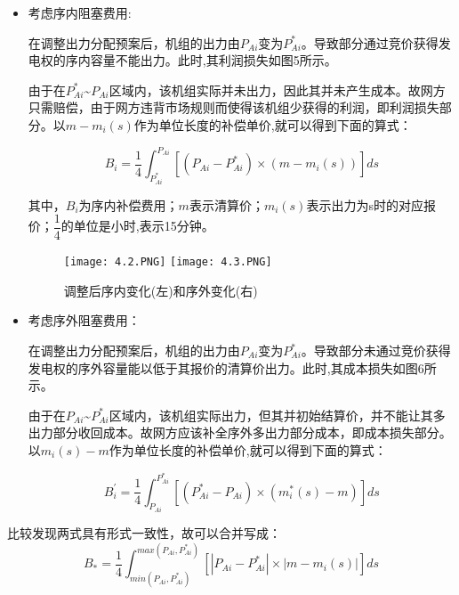 \documentclass[12pt,a4paper]{ctexart}
\begin{document}
\begin{itemize}
	\vspace{0.5em}
	\item 考虑序内阻塞费用:
	
	\vspace{0.5em}
	在调整出力分配预案后，机组的出力由$P_{Ai}$变为$P_{Ai}^{*}$。导致部分通过竞价获得发电权的序内容量不能出力。此时,其利润损失如图5所示。
	
	由于在$P_{Ai}^{*}$\~{}$P_{Ai}$区域内，该机组实际并未出力，因此其并未产生成本。故网方只需赔偿，由于网方违背市场规则而使得该机组少获得的利润，即利润损失部分。以$m-m_{i}{(s)}$作为单位长度的补偿单价,就可以得到下面的算式：
	
	\begin{equation}
		B_{i}=\dfrac{1}{4} \int_{P_{Ai}^{*}}^{P_{Ai}} [(P_{Ai}-P_{Ai}^{*})\times (m-m_{i}(s))] ds
		\label{1}
	\end{equation}
	
	其中，$B_{i}$为序内补偿费用；$m$表示清算价；$m_{i}{(s)}$表示出力为s时的对应报价；$\dfrac{1}{4}$的单位是小时,表示15分钟。
	
	\vspace{0.5em}
		\begin{figure}[!h]
		\centering	%
		\texttt{[image: 4.2.PNG]} %
		\texttt{[image: 4.3.PNG]} %
		\caption{调整后序内变化(左)和序外变化(右)}
	\end{figure}
	
	\item 考虑序外阻塞费用：
	
	\vspace{0.5em}
	在调整出力分配预案后，机组的出力由$P_{Ai}$变为$P_{Ai}^{*}$。导致部分未通过竞价获得发电权的序外容量能以低于其报价的清算价出力。此时,其成本损失如图6所示。
	
	由于在$P_{Ai}$\~{}$P_{Ai}^{*}$区域内，该机组实际出力，但其并初始结算价，并不能让其多出力部分收回成本。故网方应该补全序外多出力部分成本，即成本损失部分。以$m_{i}{(s)-m}$作为单位长度的补偿单价,就可以得到下面的算式：
	
	\begin{equation}
		B_{i}^{'}=\dfrac{1}{4} \int_{P_{Ai}}^{P_{Ai}^{*}} [(P_{Ai}^{*}-P_{Ai})\times (m_{i}^{*}(s)-m)] ds
		\label{2}
	\end{equation}
	
\end{itemize}

比较发现两式具有形式一致性，故可以合并写成：
\begin{equation}
	B_{*}=\dfrac{1}{4} \int_{min{(P_{Ai},P_{Ai}^{*})}}^{max{(P_{Ai},P_{Ai}^{*})}} [|P_{Ai}-P_{Ai}^{*}|\times |m-m_{i}(s)|] ds
	\label{1}
\end{equation}
\end{document}
